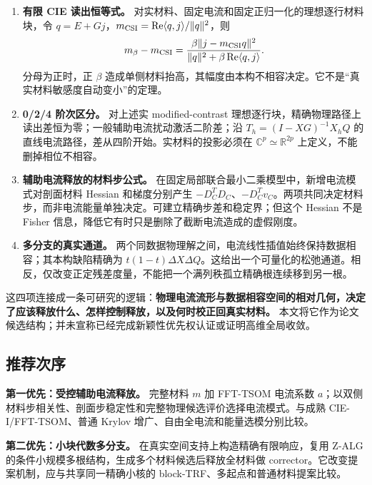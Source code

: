 \documentclass[10pt,a4paper]{article}
\providecommand{\tightlist}{\setlength{\itemsep}{0pt}\setlength{\parskip}{0pt}}
\begin{document}
\begin{enumerate}
\def\labelenumi{\arabic{enumi}.}
\tightlist
\item
  \textbf{有限 CIE 读出恒等式。}
  对实材料、固定电流和固定正归一化的理想逐行材料块，令
  \(q=E+Gj\)，\(m_{\rm CSI}=\operatorname{Re}\langle q,j\rangle/\|q\|^2\)，则
  \[m_\beta-m_{\rm CSI}=\frac{\beta\|j-m_{\rm CSI}q\|^2}{\|q\|^2+\beta\operatorname{Re}\langle q,j\rangle}.\]
  分母为正时，正 \(\beta\)
  造成单侧材料抬高，其幅度由本构不相容决定。它不是``真实材料敏感度自动变小''的定理。
\item
  \textbf{0/2/4 阶次区分。} 对上述实 modified-contrast
  理想逐行块，精确物理路径上读出差恒为零；一般辅助电流扰动激活二阶差；沿
  \(T_h=(I-XG)^{-1}X_hQ\)
  的直线电流路径，差从四阶开始。实材料的投影必须在
  \(\mathbb C^p\simeq\mathbb R^{2p}\) 上定义，不能删掉相位不相容。
\item
  \textbf{辅助电流释放的材料步公式。}
  在固定局部联合最小二乘模型中，新增电流模式对剖面材料 Hessian
  和梯度分别产生
  \(-D_C^TD_C\)、\(-D_C^Tv_C\)。两项共同决定材料步，而非电流能量单独决定。可建立精确步差和稳定界；但这个
  Hessian 不是 Fisher 信息，降低它有时只是删除了截断电流造成的虚假刚度。
\item
  \textbf{多分支的真实通道。}
  两个同数据物理解之间，电流线性插值始终保持数据相容；其本构缺陷精确为
  \(t(1-t)\Delta X\Delta Q\)。这给出一个可量化的松弛通道。相反，仅改变正定残差度量，不能把一个满列秩孤立精确根连续移到另一根。
\end{enumerate}

这四项连接成一条可研究的逻辑：\textbf{物理电流流形与数据相容空间的相对几何，决定了应该释放什么、怎样控制释放，以及何时校正回真实材料。}
本文将它作为论文候选结构；并未宣称已经完成新颖性优先权认证或证明高维全局收敛。

\hypertarget{ux63a8ux8350ux6b21ux5e8f}{%
\subsection{推荐次序}\label{ux63a8ux8350ux6b21ux5e8f}}

\textbf{第一优先：受控辅助电流释放。} 完整材料 \(m\) 加 FFT-TSOM
电流系数
\(a\)；以双侧材料步相关性、剖面步稳定性和完整物理候选评价选择电流模式。与成熟
CIE-I/FFT-TSOM、普通 Krylov 增广、自由全电流和能量选模分别比较。

\textbf{第二优先：小块代数多分支。}
在真实空间支持上构造精确有限响应，复用 Z-ALG
的条件小规模多根结构，生成多个材料候选后释放全材料做
corrector。它改变提案机制，应与共享同一精确小核的
block-TRF、多起点和普通材料提案比较。
\end{document}

